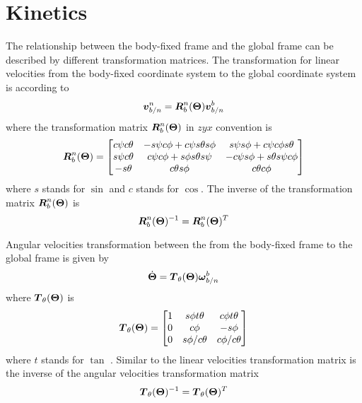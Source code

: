\section{Kinetics} \label{sec:kinetics}
The relationship between the body-fixed frame and the global frame can be described by different transformation matrices.
The transformation for linear velocities from the body-fixed coordinate system to the global coordinate system is according to \citet[22]{fossen2011} 
\begin{equation}
\boldsymbol{v}^n_{b/n} = \boldsymbol{R}^n_b(\boldsymbol{\Theta}) \boldsymbol{v}^b_{b/n}
\end{equation}
where the transformation matrix $\boldsymbol{R}^n_b(\boldsymbol{\Theta})$ in $zyx$ convention is 
\begin{equation}
\boldsymbol{R}^n_b(\boldsymbol{\Theta}) =\begin{bmatrix}
 c\psi c\theta & -s\psi c\phi + c\psi s\theta s\phi & s\psi s\phi + c\psi c\phi s \theta \\
 s\psi c\theta & c\psi c\phi + s\phi  s\theta s\psi & -c\psi s\phi + s\theta s\psi c\phi \\
 -s\theta & c\theta s\phi & c\theta c\phi
 \end{bmatrix} 
\end{equation}
where $s$ stands for $\sin$ and $c$ stands for $\cos$. The inverse of the transformation matrix $\boldsymbol{R}^n_b(\boldsymbol{\Theta})$ is
\begin{equation}
\boldsymbol{R}^n_b(\boldsymbol{\Theta})^{-1} = \boldsymbol{R}^n_b(\boldsymbol{\Theta})^T
\end{equation}

Angular velocities transformation between the from the body-fixed frame to the global frame is given by 
\begin{equation}
\dot{\boldsymbol{\Theta}} = \boldsymbol{T}_{\theta}(\boldsymbol{\Theta})\boldsymbol{\omega}^b_{b/n}
\end{equation}
where $\boldsymbol{T}_{\theta}(\boldsymbol{\Theta})$ is 
\begin{equation}
\boldsymbol{T}_{\theta}(\boldsymbol{\Theta}) = \begin{bmatrix}
1 & s\phi t\theta & c\phi t\theta \\
0 & c\phi & -s\phi \\
0 & s\phi/c\theta & c\phi/c\theta
\end{bmatrix}
\end{equation}
where $t$ stands for $\tan$ \citep[24-25]{fossen2011}. Similar to the linear velocities transformation matrix is the inverse of the angular velocities transformation matrix
\begin{equation}
\boldsymbol{T}_{\theta}(\boldsymbol{\Theta})^{-1} = \boldsymbol{T}_{\theta}(\boldsymbol{\Theta})^T
\end{equation}

